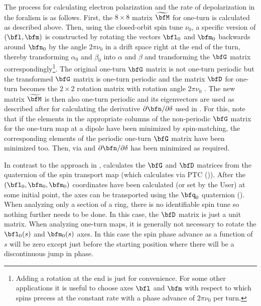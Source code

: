 {The process for calculating electron polarization and the rate of depolarization in the 
foralism is as follows. First, the $8 \times 8$ matrix $\widetilde\bfM$ for one-turn is calculated
as described above. Then, using the closed-orbit spin tune $\nu_0$, a specific version of $(\bfl,
\bfm)$ is constructed by rotating the vectors $\bfl_0$ and $ \bfm_0$ backwards around $ \bfn_0$ by
the angle $2\pi \nu_0$ in a drift space right at the end of the turn, thereby transforming
$\alpha_0$ and $\beta_0$ into $\alpha$ and $\beta$ and transforming the $\bfG$ matrix
correspondingly\footnote{Adding a rotation at the end is just for convenience. For some other
applications it is useful to choose axes $ \bfl$ and $ \bfm$ with respect to which spins precess at
the constant rate with a phase advance of $2\pi \nu_0$ per turn.}. The original one-turn $\bfG$
matrix is not one-turn periodic but the transformed $\bfG$ matrix is one-turn periodic and the
matrix $\bfD$ for one-turn becomes the $2 \times 2$ rotation matrix with rotation angle $2\pi \nu_0$
\cite{b:chao.spin}.  The new matrix $\widetilde \bfM$ is then also one-turn periodic and its
eigenvectors are used as described after  for calculating the derivative ${\partial
\bfn}/\partial \delta$ used in .  For this, note that if the elements in the appropriate
columns of the non-periodic $\bfG$ matrix for the one-turn map at a dipole have been minimized by
spin-matching, the corresponding elements of the periodic one-turn $\bfG$ matrix have been minimized
too. Then, via  and  $\partial\bfn/\partial\delta$ has been minimized as
required.

In contrast to the approach in \cite{b:barber85,b:barber99}, \bmad calculates the $\bfG$ and $\bfD$
matrices from the quaternion of the spin transport map (which \bmad calculates via PTC
()).  After the $(\bfl_0, \bfn_0, \bfm_0)$ coordinates have been calculated (or set by
the User) at some initial point, the axes can be transported using the $\bfq_0$ quaternion
(). When analyzing only a section of a ring, there is no identifiable spin tune so nothing
further needs to be done. In this case, the $\bfD$ matrix is just a unit matrix. When analyzing
one-turn maps, it is generally not necessary to rotate the $\bfl_0(s)$ and $\bfm_0(s)$ axes. In this
case the spin phase advance as a function of $s$ will be zero except just before the starting
position where there will be a discontinuous jump in phase.

}

